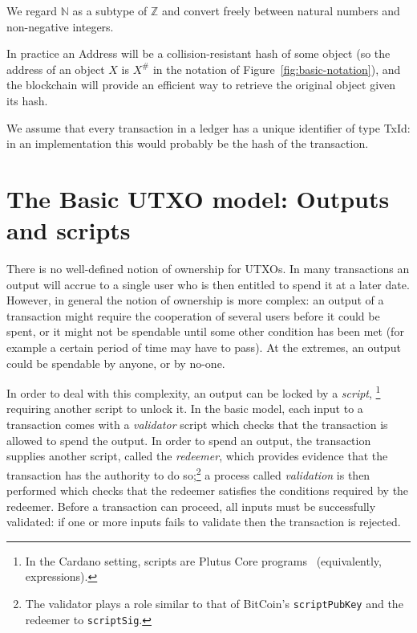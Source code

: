 \documentclass[a4paper]{article}
\renewcommand{\i}{\textit}  %
\newcommand{\s}{\textsf}  %
\theoremstyle{definition}  %
\newcommand\N{\ensuremath{\mathbb{N}}}
\newcommand\Z{\ensuremath{\mathbb{Z}}}
\begin{document}
\noindent We regard $\N$ as a subtype of $\Z$ and convert freely between
natural numbers and non-negative integers.

\medskip
\noindent In practice an \textsf{Address} will be a
collision-resistant hash of some object (so the address of an object
$X$ is $X^{\#}$ in the notation of Figure~\ref{fig:basic-notation}),
and the blockchain will provide an efficient way to retrieve the
original object given its hash.


\medskip
\noindent We assume that every transaction in a ledger has a unique identifier
of type \s{TxId}: in an implementation this would probably be the
hash of the transaction.





\section{The Basic UTXO model: Outputs and scripts}
\label{sec:utxo-intro}

There is no well-defined notion of ownership for UTXOs.  In many
transactions an output will accrue to a single user who is then
entitled to spend it at a later date.  However, in general the notion
of ownership is more complex: an output of a transaction might require
the cooperation of several users before it could be spent, or it might
not be spendable until some other condition has been met (for example
a certain period of time may have to pass).  At the extremes, an
output could be spendable by anyone, or by no-one.

In order to deal with this complexity, an output can be locked by a
\textit{script},%
\footnote{In the Cardano setting, scripts are Plutus Core
  programs~\citep{Plutus-Core-spec} (equivalently, expressions).  }
requiring another script to unlock it.  In the basic model, each input
to a transaction comes with a \i{validator} script which checks that
the transaction is allowed to spend the output. In order to spend an
output, the transaction supplies another script, called the
\i{redeemer}, which provides evidence that the transaction has the
authority to do so;\footnote{The validator plays a role similar to
  that of BitCoin's \texttt{scriptPubKey} and the redeemer to
  \texttt{scriptSig}.  } a process called \i{validation} is then
performed which checks that the redeemer satisfies the conditions
required by the redeemer. Before a transaction can proceed, all inputs
must be successfully validated: if one or more inputs fails to
validate then the transaction is rejected.
\end{document}
